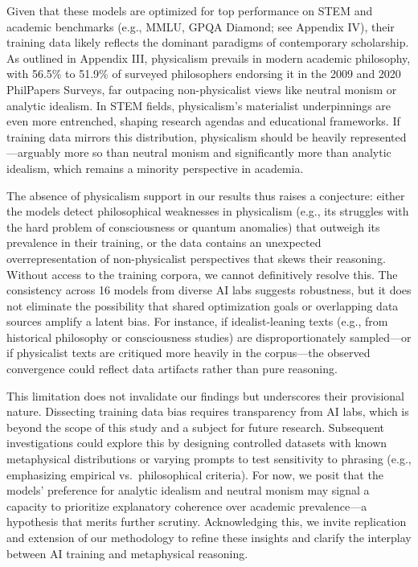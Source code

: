 Given that these models are optimized for top performance on STEM and
academic benchmarks (e.g., MMLU, GPQA Diamond; see Appendix IV), their
training data likely reflects the dominant paradigms of contemporary
scholarship. As outlined in Appendix III, physicalism prevails in modern
academic philosophy, with 56.5\% to 51.9\% of surveyed philosophers
endorsing it in the 2009 and 2020 PhilPapers Surveys, far outpacing
non-physicalist views like neutral monism or analytic idealism. In STEM
fields, physicalism's materialist underpinnings are even more
entrenched, shaping research agendas and educational frameworks. If
training data mirrors this distribution, physicalism should be heavily
represented---arguably more so than neutral monism and significantly
more than analytic idealism, which remains a minority perspective in
academia.

The absence of physicalism support in our results thus raises a
conjecture: either the models detect philosophical weaknesses in
physicalism (e.g., its struggles with the hard problem of consciousness
or quantum anomalies) that outweigh its prevalence in their training, or
the data contains an unexpected overrepresentation of non-physicalist
perspectives that skews their reasoning. Without access to the training
corpora, we cannot definitively resolve this. The consistency across 16
models from diverse AI labs suggests robustness, but it does not
eliminate the possibility that shared optimization goals or overlapping
data sources amplify a latent bias. For instance, if idealist-leaning
texts (e.g., from historical philosophy or consciousness studies) are
disproportionately sampled---or if physicalist texts are critiqued more
heavily in the corpus---the observed convergence could reflect data
artifacts rather than pure reasoning.

This limitation does not invalidate our findings but underscores their
provisional nature. Dissecting training data bias requires transparency
from AI labs, which is beyond the scope of this study and a subject for
future research. Subsequent investigations could explore this by
designing controlled datasets with known metaphysical distributions or
varying prompts to test sensitivity to phrasing (e.g., emphasizing
empirical vs.~philosophical criteria). For now, we posit that the
models' preference for analytic idealism and neutral monism may signal a
capacity to prioritize explanatory coherence over academic
prevalence---a hypothesis that merits further scrutiny. Acknowledging
this, we invite replication and extension of our methodology to refine
these insights and clarify the interplay between AI training and
metaphysical reasoning.

